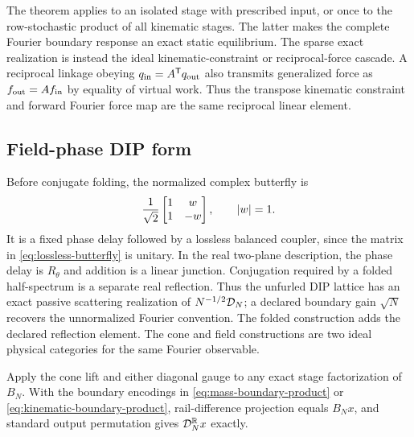The theorem applies to an isolated stage with prescribed input, or once to the
row-stochastic product of all kinematic stages.  The latter makes the complete
Fourier boundary response an exact static equilibrium.  The sparse exact
realization is instead the ideal kinematic-constraint or reciprocal-force
cascade.  A reciprocal linkage obeying
$q_{\rm in}=A^{\mathsf{T}}q_{\rm out}$ also transmits generalized force as
$f_{\rm out}=Af_{\rm in}$ by equality of virtual work.  Thus the transpose
kinematic constraint and forward Fourier force map are the same reciprocal
linear element.

\subsection{Field-phase DIP form}

Before conjugate folding, the normalized complex butterfly is
\begin{equation}
 {1\over\sqrt2}\begin{bmatrix}1&w\\1&-w\end{bmatrix},
 \qquad |w|=1.
 \label{eq:lossless-butterfly}
\end{equation}
It is a fixed phase delay followed by a lossless balanced coupler, since the
matrix in \eqref{eq:lossless-butterfly} is unitary.  In the real two-plane
description, the phase delay is $R_\theta$ and addition is a linear junction.
Conjugation required by a folded half-spectrum is a separate real reflection.
Thus the unfurled DIP lattice has an exact passive scattering realization of
$N^{-1/2}\mathcal{D}_N$; a declared boundary gain $\sqrt N$ recovers the unnormalized
Fourier convention.  The folded construction adds the declared reflection
element.  The cone and field constructions are two ideal physical categories
for the same Fourier observable.

\begin{corollary}
Apply the cone lift and either diagonal gauge to any exact stage factorization
of $B_N$.  With the boundary encodings in
\eqref{eq:mass-boundary-product} or
\eqref{eq:kinematic-boundary-product}, rail-difference projection equals
$B_Nx$, and standard output permutation gives $\mathcal{D}_N^{\mathbb{R}}x$ exactly.
\end{corollary}
